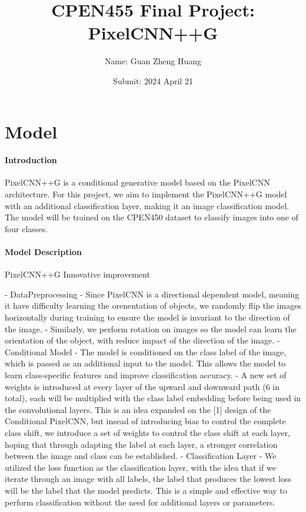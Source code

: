 \documentclass{article}
\title{CPEN455 Final Project: PixelCNN++G}
\author{Name: Guan Zheng Huang}
\date{Submit: 2024 April 21}
\begin{document}
\pagestyle{fancy}
\fancyhead{} %

\maketitle
\thispagestyle{fancy}
\section{Model}

\paragraph{Introduction}
PixelCNN++G is a conditional generative model based on the PixelCNN architecture. For this project, we aim to implement the PixelCNN++G model with an additional classification layer, making it an image classification model. The model will be trained on the CPEN450 dataset to classify images into one of four classes.

\paragraph{Model Description}
PixelCNN++G Innovative improvement

- DataPreprocessing
  - Since PixelCNN is a directional dependent model, meaning it have difficulty learning the orenentation of objects, we randomly flip the images horizontally during training to ensure the model is invariant to the direction of the image. 
  - Similarly, we perform rotation on images so the model can learn the orientation of the object, with reduce impact of the direction of the image.
- Conditional Model
    - The model is conditioned on the class label of the image, which is passed as an additional input to the model. This allows the model to learn class-specific features and improve classification accuracy.
    - A new set of weights is introduced at every layer of the upward and downward path (6 in total), each will be multiplied with the class label embedding before being used in the convolutional layers. This is an idea expanded on the [1] design of the Conditional PixelCNN, but insead of introducing bias to control the complete class shift, we introduce a set of weights to control the class shift at each layer, hoping that through adapting the label at each layer, a stronger correlation between the image and class can be established.
- Classification Layer
    - We utilized the loss function as the classification layer, with the idea that if we iterate through an image with all labels, the label that produces the lowest loss will be the label that the model predicts. This is a simple and effective way to perform classification without the need for additional layers or parameters.
\end{document}
